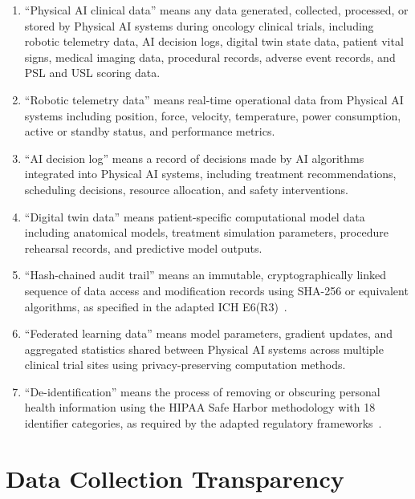 \documentclass[11pt,letterpaper]{article}
\begin{document}
\begin{enumerate}[label=(\alph*)]
\item ``Physical AI clinical data'' means any data generated, collected,
  processed, or stored by Physical AI systems during oncology clinical trials,
  including robotic telemetry data, AI decision logs, digital twin state data,
  patient vital signs, medical imaging data, procedural records, adverse event
  records, and PSL and USL scoring data.

\item ``Robotic telemetry data'' means real-time operational data from Physical
  AI systems including position, force, velocity, temperature, power
  consumption, active or standby status, and performance metrics.

\item ``AI decision log'' means a record of decisions made by AI algorithms
  integrated into Physical AI systems, including treatment recommendations,
  scheduling decisions, resource allocation, and safety interventions.

\item ``Digital twin data'' means patient-specific computational model data
  including anatomical models, treatment simulation parameters, procedure
  rehearsal records, and predictive model outputs.

\item ``Hash-chained audit trail'' means an immutable, cryptographically linked
  sequence of data access and modification records using SHA-256 or equivalent
  algorithms, as specified in the adapted ICH E6(R3)~\cite{iche6r3adapt}.

\item ``Federated learning data'' means model parameters, gradient updates, and
  aggregated statistics shared between Physical AI systems across multiple
  clinical trial sites using privacy-preserving computation methods.

\item ``De-identification'' means the process of removing or obscuring personal
  health information using the HIPAA Safe Harbor methodology with 18
  identifier categories, as required by the adapted regulatory
  frameworks~\cite{cfr50adapt}.
\end{enumerate}

\section{Data Collection Transparency}
\end{document}
